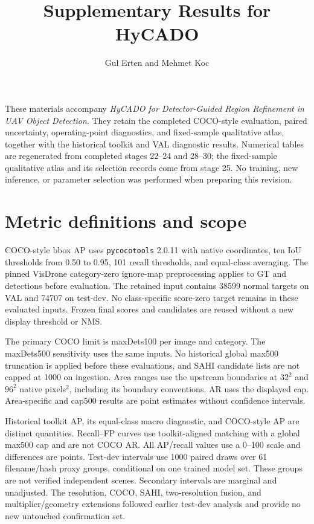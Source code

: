 \documentclass[10pt,letterpaper]{article}
\title{Supplementary Results for HyCADO}
\author{Gul Erten and Mehmet Koc}
\date{}
\begin{document}
\maketitle
These materials accompany \emph{HyCADO for Detector-Guided Region Refinement in UAV Object Detection}. They retain the completed COCO-style evaluation, paired uncertainty, operating-point diagnostics, and fixed-sample qualitative atlas, together with the historical toolkit and VAL diagnostic results. Numerical tables are regenerated from completed stages 22--24 and 28--30; the fixed-sample qualitative atlas and its selection records come from stage 25. No training, new inference, or parameter selection was performed when preparing this revision.

\section{Metric definitions and scope}
COCO-style bbox AP uses \texttt{pycocotools} 2.0.11 with native coordinates, ten IoU thresholds from 0.50 to 0.95, 101 recall thresholds, and equal-class averaging. The pinned VisDrone category-zero ignore-map preprocessing applies to GT and detections before evaluation. The retained input contains 38599 normal targets on VAL and 74707 on test-dev. No class-specific score-zero target remains in these evaluated inputs. Frozen final scores and candidates are reused without a new display threshold or NMS.

The primary COCO limit is maxDets100 per image and category. The maxDets500 sensitivity uses the same inputs. No historical global max500 truncation is applied before these evaluations, and SAHI candidate lists are not capped at 1000 on ingestion. Area ranges use the upstream boundaries at $32^2$ and $96^2$ native pixels$^2$, including its boundary conventions. AR uses the displayed cap. Area-specific and cap500 results are point estimates without confidence intervals.

Historical toolkit AP, its equal-class macro diagnostic, and COCO-style AP are distinct quantities. Recall--FP curves use toolkit-aligned matching with a global max500 cap and are not COCO AR. All AP/recall values use a 0--100 scale and differences are points. Test-dev intervals use 1000 paired draws over 61 filename/hash proxy groups, conditional on one trained model set. These groups are not verified independent scenes. Secondary intervals are marginal and unadjusted. The resolution, COCO, SAHI, two-resolution fusion, and multiplier/geometry extensions followed earlier test-dev analysis and provide no new untouched confirmation set.
\end{document}
